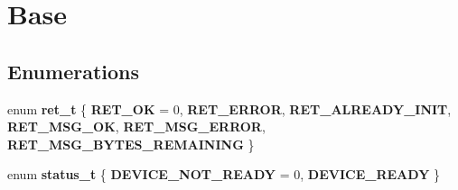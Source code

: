 \hypertarget{group___b_a_s_e}{\section{\-Base}
\label{group___b_a_s_e}
}
\subsection*{\-Enumerations}
\begin{DoxyCompactItemize}
\item 
enum {\bfseries ret\-\_\-t} \{ \*
{\bfseries \-R\-E\-T\-\_\-\-O\-K} = 0, 
{\bfseries \-R\-E\-T\-\_\-\-E\-R\-R\-O\-R}, 
{\bfseries \-R\-E\-T\-\_\-\-A\-L\-R\-E\-A\-D\-Y\-\_\-\-I\-N\-I\-T}, 
{\bfseries \-R\-E\-T\-\_\-\-M\-S\-G\-\_\-\-O\-K}, 
\*
{\bfseries \-R\-E\-T\-\_\-\-M\-S\-G\-\_\-\-E\-R\-R\-O\-R}, 
{\bfseries \-R\-E\-T\-\_\-\-M\-S\-G\-\_\-\-B\-Y\-T\-E\-S\-\_\-\-R\-E\-M\-A\-I\-N\-I\-N\-G}
 \}
\item 
enum {\bfseries status\-\_\-t} \{ {\bfseries \-D\-E\-V\-I\-C\-E\-\_\-\-N\-O\-T\-\_\-\-R\-E\-A\-D\-Y} =  0, 
{\bfseries \-D\-E\-V\-I\-C\-E\-\_\-\-R\-E\-A\-D\-Y}
 \}
\end{DoxyCompactItemize}
